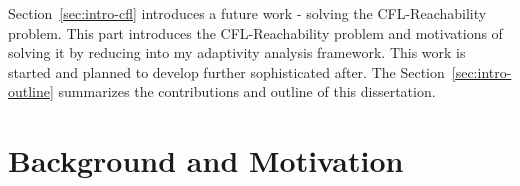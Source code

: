  Section~\ref{sec:intro-cfl} introduces a future work - solving the CFL-Reachability problem.
This part introduces the CFL-Reachability problem and motivations of 
solving it by reducing into my adaptivity analysis framework. 
 This work is started and planned to 
develop further sophisticated after.
The Section~\ref{sec:intro-outline} summarizes the contributions and outline of this dissertation.
\section{Background and Motivation}
\label{sec:intro-motivation}
  
